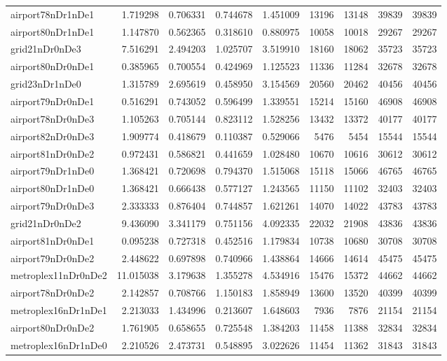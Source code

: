 \begin{longtable}{|l|r|r|r|r|r|r|r|r|}
airport78nDr1nDe1 & 1.719298 & 0.706331 & 0.744678 & 1.451009 & 13196 & 13148 & 39839 & 39839 \\
airport80nDr1nDe1 & 1.147870 & 0.562365 & 0.318610 & 0.880975 & 10058 & 10018 & 29267 & 29267 \\
grid21nDr0nDe3 & 7.516291 & 2.494203 & 1.025707 & 3.519910 & 18160 & 18062 & 35723 & 35723 \\
airport80nDr0nDe1 & 0.385965 & 0.700554 & 0.424969 & 1.125523 & 11336 & 11284 & 32678 & 32678 \\
grid23nDr1nDe0 & 1.315789 & 2.695619 & 0.458950 & 3.154569 & 20560 & 20462 & 40456 & 40456 \\
airport79nDr0nDe1 & 0.516291 & 0.743052 & 0.596499 & 1.339551 & 15214 & 15160 & 46908 & 46908 \\
airport78nDr0nDe3 & 1.105263 & 0.705144 & 0.823112 & 1.528256 & 13432 & 13372 & 40177 & 40177 \\
airport82nDr0nDe3 & 1.909774 & 0.418679 & 0.110387 & 0.529066 & 5476 & 5454 & 15544 & 15544 \\
airport81nDr0nDe2 & 0.972431 & 0.586821 & 0.441659 & 1.028480 & 10670 & 10616 & 30612 & 30612 \\
airport79nDr1nDe0 & 1.368421 & 0.720698 & 0.794370 & 1.515068 & 15118 & 15066 & 46765 & 46765 \\
airport80nDr1nDe0 & 1.368421 & 0.666438 & 0.577127 & 1.243565 & 11150 & 11102 & 32403 & 32403 \\
airport79nDr0nDe3 & 2.333333 & 0.876404 & 0.744857 & 1.621261 & 14070 & 14022 & 43783 & 43783 \\
grid21nDr0nDe2 & 9.436090 & 3.341179 & 0.751156 & 4.092335 & 22032 & 21908 & 43836 & 43836 \\
airport81nDr0nDe1 & 0.095238 & 0.727318 & 0.452516 & 1.179834 & 10738 & 10680 & 30708 & 30708 \\
airport79nDr0nDe2 & 2.448622 & 0.697898 & 0.740966 & 1.438864 & 14666 & 14614 & 45475 & 45475 \\
metroplex11nDr0nDe2 & 11.015038 & 3.179638 & 1.355278 & 4.534916 & 15476 & 15372 & 44662 & 44662 \\
airport78nDr0nDe2 & 2.142857 & 0.708766 & 1.150183 & 1.858949 & 13600 & 13520 & 40399 & 40399 \\
metroplex16nDr1nDe1 & 2.213033 & 1.434996 & 0.213607 & 1.648603 & 7936 & 7876 & 21154 & 21154 \\
airport80nDr0nDe2 & 1.761905 & 0.658655 & 0.725548 & 1.384203 & 11458 & 11388 & 32834 & 32834 \\
metroplex16nDr1nDe0 & 2.210526 & 2.473731 & 0.548895 & 3.022626 & 11454 & 11362 & 31843 & 31843 \\

\end{longtable}
